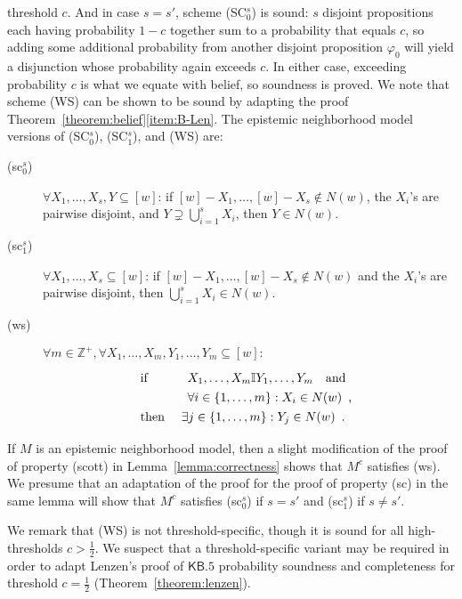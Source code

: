 \documentclass[12pt]{article}
\theoremstyle{definition}
\newcommand{\Int}{\mathbb{Z}}  %
\newcommand{\KBeq}{{\mathsf{KB.5}}}             %
\begin{document}
\begin{enumerate}
threshold $c$.  And in case $s=s'$, scheme (SC$_0^s$) is sound: $s$
disjoint propositions each having probability $1-c$ together sum to a
probability that equals $c$, so adding some additional probability
from another disjoint proposition $\varphi_0$ will yield a disjunction
whose probability again exceeds $c$.  In either case, exceeding
probability $c$ is what we equate with belief, so soundness is proved.
We note that scheme (WS) can be shown to be sound by adapting the
proof Theorem~\ref{theorem:belief}\eqref{item:B-Len}.  The epistemic
neighborhood model versions of (SC$_0^s$), (SC$_1^s$), and (WS) are:
\begin{description}
\item[(sc$_0^s$)] $\forall X_1,\dots,X_s,Y\subseteq[w]$:
  if $[w]-X_1,\dots,[w]-X_s\notin N(w)$,
  the $X_i$'s are pairwise disjoint, and $Y\supsetneq\bigcup_{i=1}^sX_i$,
  then $Y\in N(w)$.

\item[(sc$_1^s$)] $\forall X_1,\dots,X_s\subseteq[w]$: if
  $[w]-X_1,\dots,[w]-X_s\notin N(w)$ and the $X_i$'s are
  pairwise disjoint, then $\bigcup_{i=1}^sX_i\in N(w)$.
 
\item[(ws)] $\forall m\in\Int^+,\forall
  X_1,\dots,X_m,Y_1,\dots,Y_m\subseteq[w]:$
  \[
  \renewcommand{\arraystretch}{1.3}
  \begin{array}{ll}
    \text{if }
    &
    \begin{array}[t]{l}
      X_1,\dots,X_m\mathbb{I}Y_1,\dots,Y_m\quad\text{and}
      \\
      \forall i\in\{1,\dots,m\}:
      X_i\in N(w) \enspace\text{,}
    \end{array}
    \\
    \text{then }
    &
    \exists j\in\{1,\dots,m\}: Y_j\in N(w)\enspace\text{.}
  \end{array}
  \]
\end{description}
If $M$ is an epistemic neighborhood model, then a slight modification
of the proof of property (scott) in Lemma~\ref{lemma:correctness}
shows that $M^c$ satisfies (ws).  We presume that an adaptation of the
proof for the proof of property (sc) in the same lemma will show that
$M^c$ satisfies (sc$_0^s$) if $s=s'$ and (sc$_1^s$) if $s\neq s'$.

We remark that (WS) is not threshold-specific, though it is sound for
all high-thresholds $c>\frac 12$.  We suspect that a
threshold-specific variant may be required in order to adapt Lenzen's
proof of $\KBeq$ probability soundness and completeness for threshold
$c=\frac 12$ (Theorem~\ref{theorem:lenzen}).


\end{enumerate}
\end{document}
